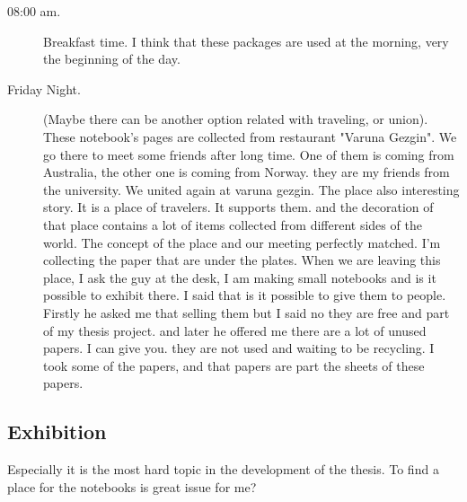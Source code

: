 \begin{description}
\item[08:00 am.] Breakfast time. I think that these packages are used at the morning, very the beginning of the day.

\item[Friday Night.] (Maybe there can be another option related with traveling, or union). These notebook's pages are collected from restaurant "Varuna Gezgin". We go there to meet some friends after long time. One of them is coming from Australia, the other one is coming from Norway. they are my friends from the university. We united again at varuna gezgin. The place also interesting story. It is a place of travelers. It supports them. and the decoration of that place contains a lot of items collected from different sides of the world. The concept of the place and our meeting perfectly matched. I'm collecting the paper that are under the plates. When we are leaving this place, I ask the guy at the desk, I am making small notebooks and is it possible to exhibit there. I said that is it possible to give them to people. Firstly he asked me that selling them but I said no they are free and part of my thesis project. and later he offered me there are a lot of unused papers. I can give you. they are not used and waiting to be recycling. I took some of the papers, and that papers are part the sheets of these papers. 


\end{description}






%
%
\subsection{Exhibition}
Especially it is the most hard topic in the development of the thesis. To find a place for the notebooks is great issue for me? 


